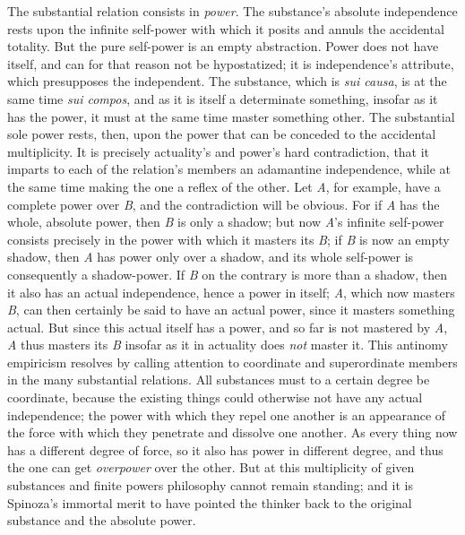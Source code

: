 \documentclass[12pt]{book}
\begin{document}
The substantial relation consists in \emph{power}. The substance's absolute
independence rests upon the infinite self-power with which it posits and
annuls the accidental totality. But the pure self-power is an empty
abstraction. Power does not have itself, and can for that reason not be
hypostatized; it is independence's attribute, which presupposes the
independent. The substance, which is \textit{sui causa}, is at the same time
\textit{sui compos}, and as it is itself a determinate something, insofar as
it has the power, it must at the same time master something other. The
substantial sole power rests, then, upon the power that can be conceded to
the accidental multiplicity. It is precisely actuality's and power's hard
contradiction, that it imparts to each of the relation's members an
adamantine independence, while at the same time making the one a reflex of
the other. Let \textit{A}, for example, have a complete power over
\textit{B}, and the contradiction will be obvious. For if \textit{A} has the
whole, absolute power, then \textit{B} is only a shadow; but now
\textit{A}'s infinite self-power consists precisely in the power with which
it masters its \textit{B}; if \textit{B} is now an empty shadow, then
\textit{A} has power only over a shadow, and its whole self-power is
consequently a shadow-power. If \textit{B} on the contrary is more than a
shadow, then it also has an actual independence, hence a power in itself;
\textit{A}, which now masters \textit{B}, can then certainly be said to have
an actual power, since it masters something actual. But since this actual
itself has a power, and so far is not mastered by \textit{A}, \textit{A}
thus masters its \textit{B} insofar as it in actuality does \emph{not}
master it. This antinomy empiricism resolves by calling attention to
coordinate and superordinate members in the many substantial relations. All
substances must to a certain degree be coordinate, because the existing
things could otherwise not have any actual independence; the power with
which they repel one another is an appearance of the force with which they
penetrate and dissolve one another. As every thing now has a different
degree of force, so it also has power in different degree, and thus the one
can get \emph{overpower} over the other. But at this multiplicity of given
substances and finite powers philosophy cannot remain standing; and it is
Spinoza's immortal merit to have pointed the thinker back to the original
substance and the absolute power.
\end{document}
